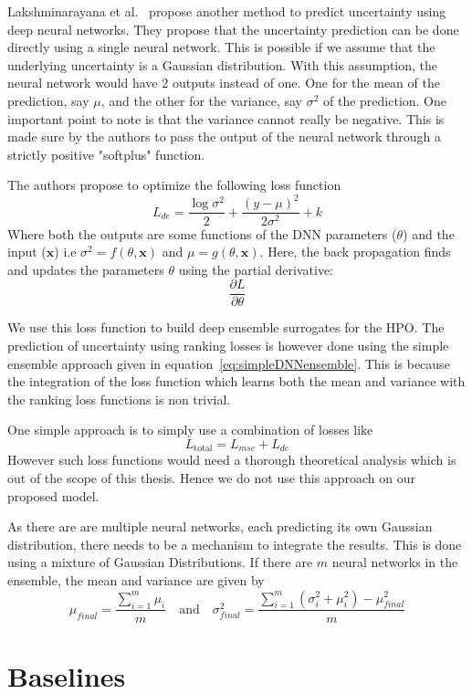 \documentclass[12pt, twoside, ngerman]{report}
\begin{document}
Lakshminarayana et al.~\cite{DeepEnsemblePaper} propose another method to predict uncertainty using deep neural networks.
They propose that the uncertainty prediction can be done directly using a single neural network.
This is possible if we assume that the underlying uncertainty is a Gaussian distribution.
With this assumption, the neural network would have 2 outputs instead of one.
One for the mean of the prediction, say $\mu$, and the other for the variance,  say $\sigma^2$
 of the prediction.
One important point to note is that the variance cannot really be negative.
This is made sure by the authors to pass the output of the neural network through a strictly positive "softplus" function.
 
The authors propose to optimize the following loss function
$$
L_{de} = \frac{\log \sigma^2 }{2} + \frac{(y - \mu)^2}{2\sigma^2} + k
$$
Where both the outputs are some functions of the DNN parameters ($\theta$) and the input ($\textbf{x}$) i.e $\sigma^2 = f(\theta,  \textbf{x})$ and $\mu = g(\theta, \textbf{x})$.
Here, the back propagation finds and updates the parameters $\theta$ using the partial derivative:
$$
\frac{\partial L}{\partial \theta}
$$


We use this loss function to build deep ensemble surrogates for the HPO.
The prediction of uncertainty using ranking losses is however done using the simple ensemble approach given in equation~\ref{eq:simpleDNNensemble}.
This is because the integration of the loss function which learns both the mean and variance with the ranking loss functions is non trivial.

One simple approach is to simply use a combination of losses like
$$
L_{\textrm{total}} = L_{mse} + L_{de}
$$
However such loss functions would need a thorough theoretical analysis which is out of the scope of this thesis.
Hence we do not use this approach on our proposed model.

As there are are multiple neural networks, each predicting its own Gaussian distribution,
there needs to be a mechanism to integrate the results.
This is done using a mixture of Gaussian Distributions.
If there are $m$ neural networks in the ensemble,  the mean and variance are given by
$$
\mu_{final} =  \frac{\sum\limits_{i=1}^{m} \mu_i}{m} \quad \textrm{and} \quad \sigma_{final}^2 = \frac{\sum\limits_{i=1}^{m} (\sigma_i^2 + \mu_i^2) - \mu_{final}^2}{m}
$$

\section{Baselines}
\end{document}
